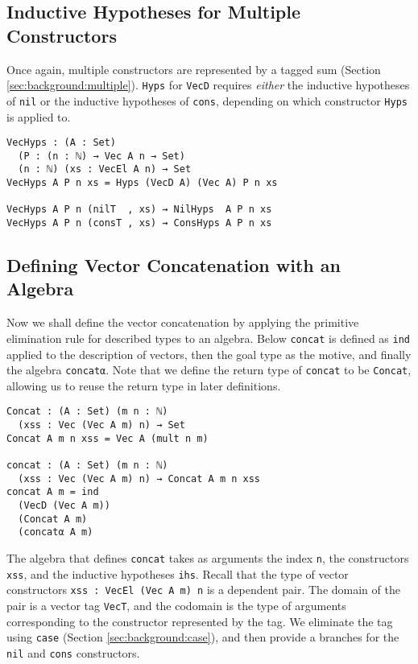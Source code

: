 \documentclass[preprint,nonatbib]{sigplanconf}
\newcommand{\refsec}[1]{Section \ref{sec:#1}}
\begin{document}
\subsection{Inductive Hypotheses for Multiple Constructors}

Once again, multiple constructors are represented by a tagged
sum (\refsec{background:multiple}). {\tt Hyps} for
{\tt VecD} requires {\it either} the inductive hypotheses of
{\tt nil} or the inductive hypotheses of {\tt cons}, depending on
which constructor {\tt Hyps} is applied to.

\begin{verbatim}
VecHyps : (A : Set)
  (P : (n : ℕ) → Vec A n → Set)
  (n : ℕ) (xs : VecEl A n) → Set
VecHyps A P n xs = Hyps (VecD A) (Vec A) P n xs

VecHyps A P n (nilT  , xs) ⇝ NilHyps  A P n xs 
VecHyps A P n (consT , xs) ⇝ ConsHyps A P n xs 
\end{verbatim}

\subsection{Defining Vector Concatenation with an Algebra}

Now we shall define the vector concatenation by applying the primitive
elimination rule for described types to an algebra. Below
{\tt concat} is defined as {\tt ind} applied to the description of
vectors, then the goal type as the motive, and finally the algebra
{\tt concatα}.
Note that we define the return type of
{\tt concat} to be {\tt Concat}, allowing us to reuse the return type
in later definitions.

\begin{verbatim}
Concat : (A : Set) (m n : ℕ)
  (xss : Vec (Vec A m) n) → Set
Concat A m n xss = Vec A (mult n m)

concat : (A : Set) (m n : ℕ)
  (xss : Vec (Vec A m) n) → Concat A m n xss
concat A m = ind
  (VecD (Vec A m))
  (Concat A m)
  (concatα A m)
\end{verbatim}

The algebra that defines {\tt concat} takes as arguments the index
{\tt n}, the constructors {\tt xss}, and the inductive hypotheses
{\tt ihs}. Recall that the type of vector constructors
{\tt xss : VecEl (Vec A m) n} is a dependent pair. The domain of the
pair is a vector tag {\tt VecT}, and the codomain is the type of
arguments corresponding to the constructor represented by the tag. We
eliminate the tag using {\tt case} (\refsec{background:case}), and
then provide a branches for the {\tt nil} and {\tt cons} constructors.
\end{document}
